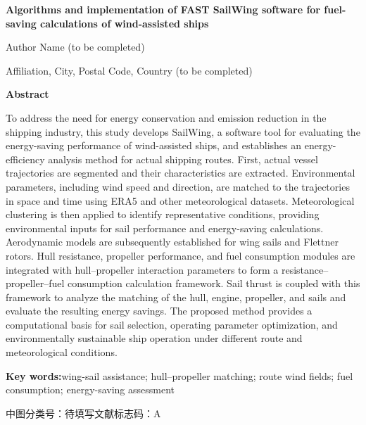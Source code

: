 \documentclass[UTF8,a4paper,twoside,zihao=5,fontset=windows]{ctexart}
\renewcommand{\baselinestretch}{1.35}
\begin{document}
\vspace{14pt}
\begin{center}
{\bfseries\fontsize{16pt}{23pt}\selectfont Algorithms and implementation of FAST SailWing software for fuel-saving calculations of wind-assisted ships\par}
\vspace{5pt}
{\fontsize{12pt}{17pt}\selectfont Author Name (to be completed)\par}
\vspace{3pt}
{Affiliation, City, Postal Code, Country (to be completed)\par}
\end{center}
\vspace{7pt}
\begin{center}\textbf{Abstract}\end{center}
\begingroup\renewcommand{\baselinestretch}{1}\fontsize{10.5pt}{17pt}\selectfont\setlength{\parindent}{2em}
To address the need for energy conservation and emission reduction in the shipping industry, this study develops SailWing, a software tool for evaluating the energy-saving performance of wind-assisted ships, and establishes an energy-efficiency analysis method for actual shipping routes. First, actual vessel trajectories are segmented and their characteristics are extracted. Environmental parameters, including wind speed and direction, are matched to the trajectories in space and time using ERA5 and other meteorological datasets. Meteorological clustering is then applied to identify representative conditions, providing environmental inputs for sail performance and energy-saving calculations. Aerodynamic models are subsequently established for wing sails and Flettner rotors. Hull resistance, propeller performance, and fuel consumption modules are integrated with hull--propeller interaction parameters to form a resistance--propeller--fuel consumption calculation framework. Sail thrust is coupled with this framework to analyze the matching of the hull, engine, propeller, and sails and evaluate the resulting energy savings. The proposed method provides a computational basis for sail selection, operating parameter optimization, and environmentally sustainable ship operation under different route and meteorological conditions.
\par\textbf{Key words:}\quad wing-sail assistance; hull--propeller matching; route wind fields; fuel consumption; energy-saving assessment
\par\endgroup

\par\noindent 中图分类号：待填写\hfill 文献标志码：A
\end{document}

